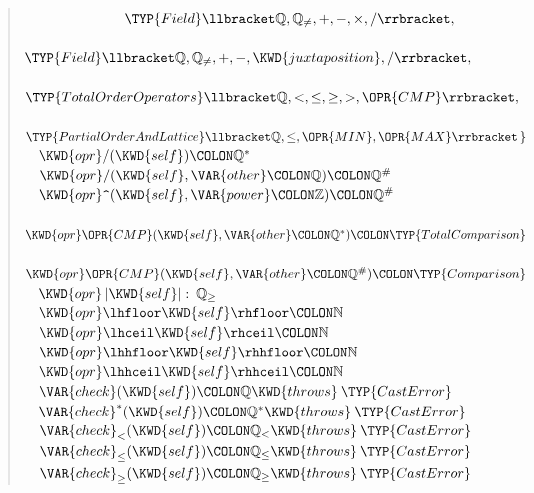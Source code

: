 \begin{description}
\begin{quote}
\begin{Fortress}
{\tt~~~~~~~~~~~~~~}\(              \TYP{Field}\llbracket\mathbb{Q},\mathbb{Q}_{\neq},+,-,\times,/\rrbracket,\)\\
{\tt~~~~~~~~~~~~~~}\(              \TYP{Field}\llbracket\mathbb{Q},\mathbb{Q}_{\neq},+,-,\KWD{juxtaposition},/\rrbracket,\)\\
{\tt~~~~~~~~~~~~~~}\(              \TYP{TotalOrderOperators}\llbracket\mathbb{Q},<,\leq,\geq,>,\OPR{CMP}\rrbracket,\)\\
{\tt~~~~~~~~~~~~~~}\(              \TYP{PartialOrderAndLattice}\llbracket\mathbb{Q},\leq,\OPR{MIN},\OPR{MAX}\rrbracket\,\}\)\\
{\tt~~}\(  \KWD{opr} /(\KWD{self})\COLON \mathbb{Q}^*\)\\
{\tt~~}\(  \KWD{opr} /(\KWD{self}, \VAR{other}\COLON \mathbb{Q})\COLON \mathbb{Q}^{\#}\)\\
{\tt~~}\(  \KWD{opr} \mathord{\hbox{\tt\char'136}}(\KWD{self}, \VAR{power}\COLON \mathbb{Z})\COLON \mathbb{Q}^{\#}\)\\
{\tt~~}\(  \KWD{opr} \mathord{\OPR{CMP}}(\KWD{self}, \VAR{other}\COLON \mathbb{Q}^*)\COLON \TYP{TotalComparison}\)\\
{\tt~~}\(  \KWD{opr} \mathord{\OPR{CMP}}(\KWD{self}, \VAR{other}\COLON \mathbb{Q}^{\#})\COLON \TYP{Comparison}\)\\
{\tt~~}\(  \KWD{opr} \left|\mathord{\KWD{self}}\right| \mathrel{\mathtt{:}}\:\mathbb{Q}_{\geq}\)\\
{\tt~~}\(  \KWD{opr} \lhfloor \mathord{\KWD{self}} \rhfloor\COLON \mathbb{N}\)\\
{\tt~~}\(  \KWD{opr} \lhceil \mathord{\KWD{self}} \rhceil\COLON \mathbb{N}\)\\
{\tt~~}\(  \KWD{opr} \lhhfloor \mathord{\KWD{self}} \rhhfloor\COLON \mathbb{N}\)\\
{\tt~~}\(  \KWD{opr} \lhhceil \mathord{\KWD{self}} \rhhceil\COLON \mathbb{N}\)\\
{\tt~~}\(  \VAR{check}(\KWD{self})\COLON \mathbb{Q} \KWD{throws}\:\TYP{CastError}\)\\
{\tt~~}\(  \VAR{check}^*(\KWD{self})\COLON \mathbb{Q}^* \KWD{throws}\:\TYP{CastError}\)\\
{\tt~~}\(  \VAR{check}_{<}(\KWD{self})\COLON \mathbb{Q}_{<} \KWD{throws}\:\TYP{CastError}\)\\
{\tt~~}\(  \VAR{check}_{\leq}(\KWD{self})\COLON \mathbb{Q}_{\leq} \KWD{throws}\:\TYP{CastError}\)\\
{\tt~~}\(  \VAR{check}_{\geq}(\KWD{self})\COLON \mathbb{Q}_{\geq} \KWD{throws}\:\TYP{CastError}\)\\

\end{Fortress}
\end{quote}
\end{description}
